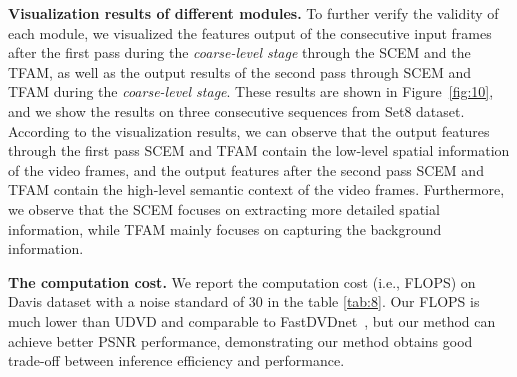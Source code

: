 \documentclass[journal]{IEEEtran}
\begin{document}
\begin{table}[htbp]
\renewcommand{\arraystretch}{1.2}
\end{table}

\noindent
\textbf{Visualization results of different modules.} To further verify the validity of each module, we visualized the features output of the consecutive input frames after the first pass during the \emph{coarse-level stage} through the SCEM and the TFAM, as well as the output results of the second pass through SCEM and TFAM during the \emph{coarse-level stage}. 
These results are shown in Figure~\ref{fig:10}, and we show the results on three consecutive sequences from Set8 dataset. According to the visualization results, we can observe that the output features through the first pass SCEM and TFAM contain the low-level spatial information of the video frames, and the output features after the second pass SCEM and TFAM contain the high-level semantic context of the video frames. Furthermore, we observe that the SCEM focuses on extracting more detailed spatial information, while TFAM mainly focuses on capturing the background information. 

\noindent
\textbf{The computation cost. } 
We report the computation cost (i.e., FLOPS) on Davis dataset with a noise standard of 30 in the table \ref{tab:8}. Our FLOPS is much lower than UDVD\cite{Sheth_2021_ICCV} and comparable to FastDVDnet~\cite{Tassano2020FastDVDnetTR}, but our method can achieve better PSNR performance, demonstrating our method obtains good trade-off between inference efficiency and performance.
 
\end{document}
